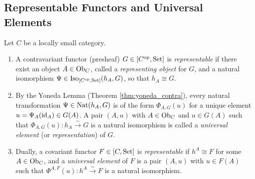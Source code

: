 \documentclass[10pt,a4paper]{article}
\begin{document}
\subsection{Representable Functors and Universal Elements}
\begin{definition}\label{def:representable}
Let $C$ be a locally small category.
\begin{enumerate}
\item A contravariant functor (presheaf) $G \in [C^{\textrm{op}}, {\textrm{Set}}]$ is \emph{representable} if there exist an object $A \in {\textrm{Ob}}_C$, called a \emph{representing object} for $G$, and a natural isomorphism $\Psi \in \mathrm{Iso}_{[C^{\textrm{op}}, {\textrm{Set}}]}(h_A, G)$, so that $h_A \cong G$.
\item By the Yoneda Lemma (Theorem \ref{thm:yoneda_contra}), every natural transformation $\Psi \in {\textrm{Nat}}(h_A, G)$ is of the form $\Phi_{A,G}(u)$ for a unique element $u = \Psi_A({\textrm{id}}_A) \in G(A)$. A pair $(A, u)$ with $A \in {\textrm{Ob}}_C$ and $u \in G(A)$ such that $\Phi_{A,G}(u) : h_A \xrightarrow{\sim} G$ is a natural isomorphism is called a \emph{universal element} (or \emph{representation}) of $G$.
\item Dually, a covariant functor $F \in [C, {\textrm{Set}}]$ is \emph{representable} if $h^A \cong F$ for some $A \in {\textrm{Ob}}_C$, and a \emph{universal element} of $F$ is a pair $(A, u)$ with $u \in F(A)$ such that $\Phi^{A,F}(u) : h^A \xrightarrow{\sim} F$ is a natural isomorphism.
\end{enumerate}
\end{definition}
\end{document}

